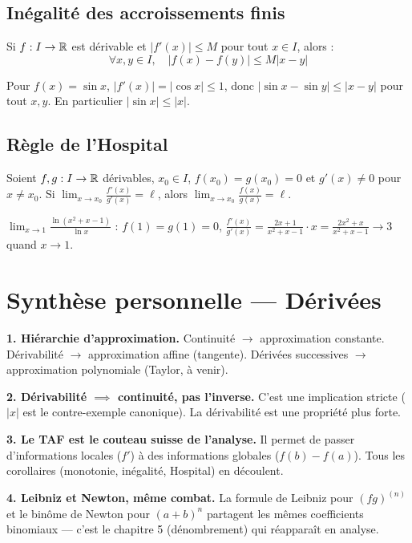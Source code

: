 \subsection{Inégalité des accroissements finis}

\begin{corollaire}
Si $f : I \to \mathbb{R}$ est dérivable et $|f'(x)| \leqslant M$ pour tout $x \in I$, alors :
\[\forall x, y \in I, \quad |f(x) - f(y)| \leqslant M|x - y|\]
\end{corollaire}

\begin{exbox}
Pour $f(x) = \sin x$, $|f'(x)| = |\cos x| \leqslant 1$, donc $|\sin x - \sin y| \leqslant |x - y|$ pour tout $x, y$. En particulier $|\sin x| \leqslant |x|$.
\end{exbox}

\subsection{Règle de l'Hospital}

\begin{corollaire}
Soient $f, g : I \to \mathbb{R}$ dérivables, $x_0 \in I$, $f(x_0) = g(x_0) = 0$ et $g'(x) \neq 0$ pour $x \neq x_0$. Si $\displaystyle\lim_{x \to x_0} \frac{f'(x)}{g'(x)} = \ell$, alors $\displaystyle\lim_{x \to x_0} \frac{f(x)}{g(x)} = \ell$.
\end{corollaire}

\begin{exbox}
$\displaystyle\lim_{x \to 1} \frac{\ln(x^2 + x - 1)}{\ln x}$ : $f(1) = g(1) = 0$, $\frac{f'(x)}{g'(x)} = \frac{2x+1}{x^2+x-1} \cdot x = \frac{2x^2 + x}{x^2 + x - 1} \to 3$ quand $x \to 1$.
\end{exbox}


\section{Synthèse personnelle --- Dérivées}

\begin{intuitionbox}
\textbf{1. Hiérarchie d'approximation.} Continuité $\to$ approximation constante. Dérivabilité $\to$ approximation affine (tangente). Dérivées successives $\to$ approximation polynomiale (Taylor, à venir).

\textbf{2. Dérivabilité $\implies$ continuité, pas l'inverse.} C'est une implication stricte ($|x|$ est le contre-exemple canonique). La dérivabilité est une propriété plus forte.

\textbf{3. Le TAF est le couteau suisse de l'analyse.} Il permet de passer d'informations locales ($f'$) à des informations globales ($f(b) - f(a)$). Tous les corollaires (monotonie, inégalité, Hospital) en découlent.

\textbf{4. Leibniz et Newton, même combat.} La formule de Leibniz pour $(fg)^{(n)}$ et le binôme de Newton pour $(a+b)^n$ partagent les mêmes coefficients binomiaux --- c'est le chapitre 5 (dénombrement) qui réapparaît en analyse.
\end{intuitionbox}


